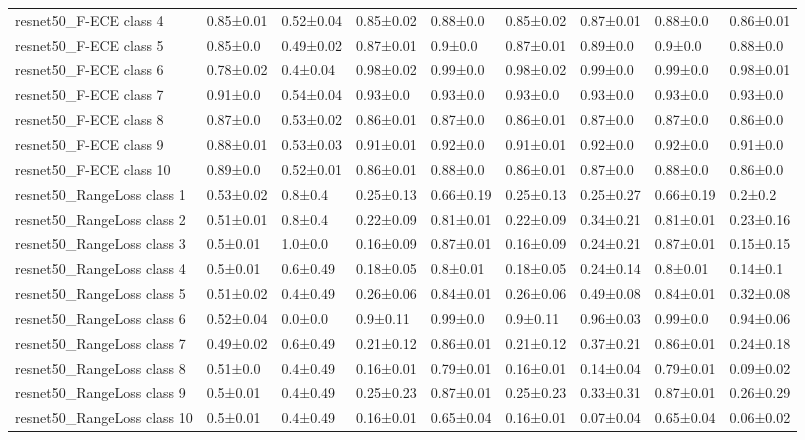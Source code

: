 \begin{tabular}{lllllllll}
resnet50_F-ECE class 4 & 0.85±0.01 & 0.52±0.04 & 0.85±0.02 & 0.88±0.0 & 0.85±0.02 & 0.87±0.01 & 0.88±0.0 & 0.86±0.01 \\
resnet50_F-ECE class 5 & 0.85±0.0 & 0.49±0.02 & 0.87±0.01 & 0.9±0.0 & 0.87±0.01 & 0.89±0.0 & 0.9±0.0 & 0.88±0.0 \\
resnet50_F-ECE class 6 & 0.78±0.02 & 0.4±0.04 & 0.98±0.02 & 0.99±0.0 & 0.98±0.02 & 0.99±0.0 & 0.99±0.0 & 0.98±0.01 \\
resnet50_F-ECE class 7 & 0.91±0.0 & 0.54±0.04 & 0.93±0.0 & 0.93±0.0 & 0.93±0.0 & 0.93±0.0 & 0.93±0.0 & 0.93±0.0 \\
resnet50_F-ECE class 8 & 0.87±0.0 & 0.53±0.02 & 0.86±0.01 & 0.87±0.0 & 0.86±0.01 & 0.87±0.0 & 0.87±0.0 & 0.86±0.0 \\
resnet50_F-ECE class 9 & 0.88±0.01 & 0.53±0.03 & 0.91±0.01 & 0.92±0.0 & 0.91±0.01 & 0.92±0.0 & 0.92±0.0 & 0.91±0.0 \\
resnet50_F-ECE class 10 & 0.89±0.0 & 0.52±0.01 & 0.86±0.01 & 0.88±0.0 & 0.86±0.01 & 0.87±0.0 & 0.88±0.0 & 0.86±0.0 \\
resnet50_RangeLoss class 1 & 0.53±0.02 & 0.8±0.4 & 0.25±0.13 & 0.66±0.19 & 0.25±0.13 & 0.25±0.27 & 0.66±0.19 & 0.2±0.2 \\
resnet50_RangeLoss class 2 & 0.51±0.01 & 0.8±0.4 & 0.22±0.09 & 0.81±0.01 & 0.22±0.09 & 0.34±0.21 & 0.81±0.01 & 0.23±0.16 \\
resnet50_RangeLoss class 3 & 0.5±0.01 & 1.0±0.0 & 0.16±0.09 & 0.87±0.01 & 0.16±0.09 & 0.24±0.21 & 0.87±0.01 & 0.15±0.15 \\
resnet50_RangeLoss class 4 & 0.5±0.01 & 0.6±0.49 & 0.18±0.05 & 0.8±0.01 & 0.18±0.05 & 0.24±0.14 & 0.8±0.01 & 0.14±0.1 \\
resnet50_RangeLoss class 5 & 0.51±0.02 & 0.4±0.49 & 0.26±0.06 & 0.84±0.01 & 0.26±0.06 & 0.49±0.08 & 0.84±0.01 & 0.32±0.08 \\
resnet50_RangeLoss class 6 & 0.52±0.04 & 0.0±0.0 & 0.9±0.11 & 0.99±0.0 & 0.9±0.11 & 0.96±0.03 & 0.99±0.0 & 0.94±0.06 \\
resnet50_RangeLoss class 7 & 0.49±0.02 & 0.6±0.49 & 0.21±0.12 & 0.86±0.01 & 0.21±0.12 & 0.37±0.21 & 0.86±0.01 & 0.24±0.18 \\
resnet50_RangeLoss class 8 & 0.51±0.0 & 0.4±0.49 & 0.16±0.01 & 0.79±0.01 & 0.16±0.01 & 0.14±0.04 & 0.79±0.01 & 0.09±0.02 \\
resnet50_RangeLoss class 9 & 0.5±0.01 & 0.4±0.49 & 0.25±0.23 & 0.87±0.01 & 0.25±0.23 & 0.33±0.31 & 0.87±0.01 & 0.26±0.29 \\
resnet50_RangeLoss class 10 & 0.5±0.01 & 0.4±0.49 & 0.16±0.01 & 0.65±0.04 & 0.16±0.01 & 0.07±0.04 & 0.65±0.04 & 0.06±0.02 \\

\end{tabular}
